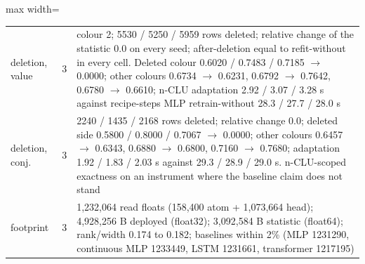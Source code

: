 \documentclass{article} %
\begin{document}
\begin{table}[h]
\begin{adjustbox}{max width=\linewidth}
\begin{tabular}{p{1.9cm}p{1.2cm}p{10.0cm}}
deletion, value & 3 & colour 2; 5530 / 5250 / 5959 rows deleted; relative change of the statistic 0.0 on every seed; after-deletion equal to refit-without in every cell. Deleted colour 0.6020 / 0.7483 / 0.7185 $\to$ 0.0000; other colours 0.6734 $\to$ 0.6231, 0.6792 $\to$ 0.7642, 0.6780 $\to$ 0.6610; n-CLU adaptation 2.92 / 3.07 / 3.28 s against recipe-steps MLP retrain-without 28.3 / 27.7 / 28.0 s \\
deletion, conj. & 3 & 2240 / 1435 / 2168 rows deleted; relative change 0.0; deleted side 0.5800 / 0.8000 / 0.7067 $\to$ 0.0000; other colours 0.6457 $\to$ 0.6343, 0.6880 $\to$ 0.6800, 0.7160 $\to$ 0.7680; adaptation 1.92 / 1.83 / 2.03 s against 29.3 / 28.9 / 29.0 s. n-CLU-scoped exactness on an instrument where the baseline claim does not stand \\
footprint & 3 & 1,232,064 read floats (158,400 atom + 1,073,664 head); 4,928,256 B deployed (float32); 3,092,584 B statistic (float64); rank/width 0.174 to 0.182; baselines within 2\% (MLP 1231290, continuous MLP 1233449, LSTM 1231661, transformer 1217195) \\
\bottomrule
\end{tabular}\end{adjustbox}
\end{table}

\end{document}
